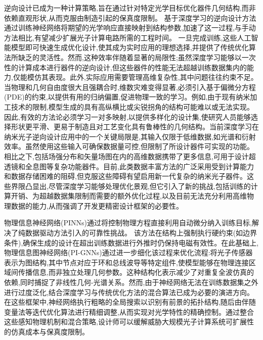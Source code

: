 \documentclass[11pt]{article}
\begin{document}
逆向设计已成为一种计算策略,旨在通过针对特定光学目标优化器件几何结构,而非依赖直观形状,从而克服由制造引起的保真度限制。\citep{doi_10_48550_arxiv_2506_21748_dc49c062} \citep{doi_10_1039_d4nr03081h_5c44e89e} 基于深度学习的逆向设计方法通过训练神经网络将期望的光学响应直接映射到结构参数,加速了这一过程,与手动方法相比,有望减少扩展光子计算电路所需的工程时间。\citep{doi_10_1117_12_3092203_3c6166cd} \citep{doi_10_1088_2040_8986_ae709e_8af9beda} 一旦完成训练,这些人工智能模型即可快速生成优化设计,使其成为实时应用的理想选择,并提供了传统优化算法所缺乏的灵活性。然而,这种效率伴随着显著的局限性;虽然深度学习能够以一次性的计算成本进行器件的逆向设计,但这些器件的性能无法超越训练数据集内的能力,仅能模仿其表现。此外,实际应用需要管理高维复杂性,其中问题往往约束不足。当物理和几何自由度很大且强耦合时,维数灾难变得显著,必须引入基于偏微分方程(PDE)的约束,以提供有用的归纳偏置,促进物理一致的学习。例如,由于现有纳米加工技术的限制,模型生成的具有高纵横比或尖锐拐角的结构可能难以或无法实现。因此,有效的方法论必须学习一对多映射,以提供多样化的设计集,使研究人员能够选择形状更平滑、更易于制造且对工艺变化具有鲁棒性的几何结构。当前深度学习在纳米光子逆向设计应用中的一个关键局限是,其输入仅限于低维数据,如光谱和衍射效率。虽然使用这些输入可确保数据量可控,但限制了所设计器件可实现的功能。相比之下,包括场强分布和矢量场图在内的高维数据携带了更多信息,可用于设计超透镜和全息图等复杂功能器件。目前,此类数据丰富方法的广泛采用受到计算能力和数据存储困难的阻碍,但克服这些障碍有望启用新一代复杂的纳米光子器件。这些界限凸显出,尽管深度学习能够处理优化景观,但它引入了新的挑战,包括训练的计算开销、为超越数据集限制而需要的额外优化过程,以及目前无法充分利用高维物理数据的能力,从而强调了开发更精密设计框架的必要性。\citep{doi_10_1515_nanoph_2024_0536_4b6631ba} \citep{doi_10_29026_oes_2022_210012_27973a69} \citep{doi_10_1002_adom_202502062_d73a85e1} \citep{doi_10_1515_nanoph_2018_0183_d85e9193}

物理信息神经网络(PINNs)通过将控制物理方程直接利用自动微分纳入训练目标,解决了纯数据驱动方法引入的可靠性挑战。\citep{doi_10_1007_s10444_023_10065_9_12bf0652} 该方法在结构上强制执行硬约束(如边界条件),确保生成的设计在超出训练数据进行外推时仍保持电磁有效性。在此基础上,物理信息图神经网络(PI-GNNs)通过进一步细化该过程来优化流程:将光子传感器表示为图结构,其中节点对应于环和总线波导等特定组件,使模型能够在物理连接区域间传播信息,而非独立处理几何参数。这种结构化表示减少了对重复全波仿真的依赖,同时捕捉了非线性几何-光谱关系。然而,由于神经网络无法在训练数据集之外进行过度泛化,结合深度学习与传统优化方法的混合算法已成为必要的演进方向。在这些框架中,神经网络执行粗略的全局搜索以识别有前景的拓扑结构,随后由伴随变量法等迭代优化算法进行精细调整,从而实现对光学特性的精确控制。通过整合这些感知物理机制和混合策略,设计师可以缓解威胁大规模光子计算系统可扩展性的仿真成本与保真度限制。\citep{s2_cc39d5405a933620426d86298fa8fe4cd51915c5_27626ee3} \citep{doi_10_1109_pn70808_2026_11657775_11c9905d} \citep{doi_10_1021_acsphotonics_2c00968_06a2e96b}
\end{document}
